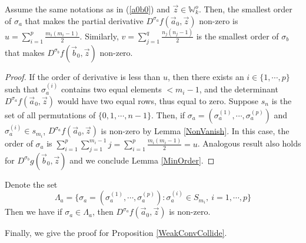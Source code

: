 \begin{lemma}{\label{MinOrder}}
Assume the same notations as in (\ref{a0b0}) and $\vec{z}\in\mathbb{W}_{k}^{o}$. Then, the smallest order of $\sigma_{a}$ that makes the partial derivative $D^{\sigma_{a}}f(\vec{a}_{0},\vec{z})$ non-zero is $u=\sum_{i=1}^{p}\frac{m_{i}(m_{i}-1)}{2}$. Similarly, $v=\sum_{j=1}^{q}\frac{n_{j}(n_{j}-1)}{2}$ is the smallest order of $\sigma_{b}$ that makes $D^{\sigma_{b}}f(\vec{b}_{0},\vec{z})$ non-zero.
\end{lemma}
\begin{proof}
	If the order of derivative is less than $u$, then there exists an $i\in\{1,\cdots,p\}$ such that $\sigma_{a}^{(i)}$ contains two equal elements $<m_i-1$, and the determinant $D^{\sigma_{a}}f(\vec{a}_{0},\vec{z})$ would have two equal rows, thus equal to zero. Suppose $s_{n}$ is the set of all permutations of $\{0,1,\cdots,n-1\}$. Then, if $\sigma_{a}=\left(\sigma^{(1)}_a,\cdots,\sigma^{(p)}_a\right)$ and $\sigma^{(i)}_a\in s_{m_i}$, $D^{\sigma_{a}}f(\vec{a}_{0},\vec{z})$ is non-zero by Lemma \ref{NonVanish}. In this case, the order of $\sigma_{a}$ is $\sum_{i=1}^{p}\sum_{j=1}^{m_i-1}j=\sum_{i=1}^{p}\frac{m_i(m_i-1)}{2}=u$. Analogous result also holds for $D^{\sigma_b}g(\vec{b}_0,\vec{z})$ and we conclude Lemma \ref{MinOrder}.
	\end{proof}
\begin{remark}{\label{Lambdaa}}
	Denote the set 
	\begin{equation}
		\Lambda_{a}=\{\sigma_{a}=\left(\sigma_{a}^{(1)},\cdots,\sigma_{a}^{(p)}\right):\sigma_{a}^{(i)}\in S_{m_i},\ i=1,\cdots, p\}
	\end{equation}
	Then we have if $\sigma_{a}\in\Lambda_a$, then $D^{\sigma_a}f(\vec{a}_0,\vec{z})$ is non-zero.
\end{remark}
Finally, we give the proof for Proposition \ref{WeakConvCollide}. 
